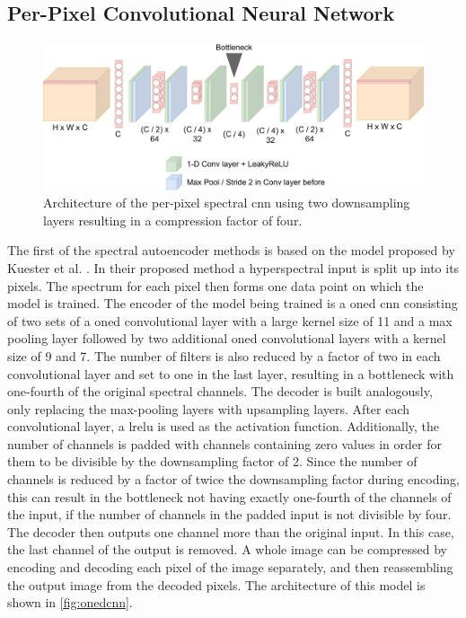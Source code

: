 \subsection{Per-Pixel Convolutional Neural Network\label{sec:conv1d}}
\begin{figure}
\centering
\includegraphics[scale=0.18]{img/OneDCNN.pdf}
\caption[Per-Pixel spectral \ac{cnn}]{Architecture of the per-pixel spectral \ac{cnn} using two downsampling layers resulting in a compression factor of four.}
\label{fig:onedcnn}
\end{figure}
The first of the spectral autoencoder methods is based on the model proposed by Kuester et al. \citep{kuester_1d-convolutional_2021,kuester_transferability_2022}. In their proposed method a hyperspectral input is split up into its pixels. The spectrum for each pixel then forms one data point on which the model is trained. The encoder of the model being trained is a \ac{oned} \ac{cnn} consisting of two sets of a \ac{oned} convolutional layer with a large kernel size of 11 and a max pooling layer followed by two additional \ac{oned} convolutional layers with a kernel size of 9 and 7. The number of filters is also reduced by a factor of two in each convolutional layer and set to one in the last layer, resulting in a bottleneck with one-fourth of the original spectral channels. The decoder is built analogously, only replacing the max-pooling layers with upsampling layers. After each convolutional layer, a \ac{lrelu} is used as the activation function. Additionally, the number of channels is padded with channels containing zero values in order for them to be divisible by the downsampling factor of 2. Since the number of channels is reduced by a factor of twice the downsampling factor during encoding, this can result in the bottleneck not having exactly one-fourth of the channels of the input, if the number of channels in the padded input is not divisible by four. The decoder then outputs one channel more than the original input. In this case, the last channel of the output is removed. A whole image can be compressed by encoding and decoding each pixel of the image separately, and then reassembling the output image from the decoded pixels. The architecture of this model is shown in \autoref{fig:onedcnn}.

